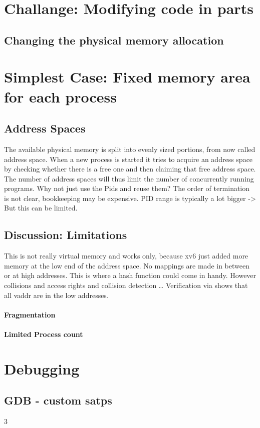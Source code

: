 \section{Challange: Modifying code in parts}
\subsection*{Changing the physical memory allocation}

\section{Simplest Case: Fixed memory area for each process}
\subsection{Address Spaces}
The available physical memory is split into evenly sized portions, from now called address space.
When a new process is started it tries to acquire an address space by checking whether
there is a free one and then claiming that free address space.
The number of address spaces will thus limit the number of concurrently running programs.
Why not just use the Pids and reuse them? The order of termination is not clear, bookkeeping
may be expensive. PID range is typically a lot bigger -> But this can be limited.
\subsection{Discussion: Limitations}
This is not really virtual memory and works only, because xv6 just added more memory at the low
end of the address space. No mappings are made in between or at high addresses.
This is where a hash function could come in handy. However collisions and access rights and
collision detection \ldots
Verification via %
shows that all vaddr are in the low addresses.
\paragraph*{Fragmentation}
\paragraph*{Limited Process count}


\section{Debugging}
\subsection{ GDB - custom satps}3